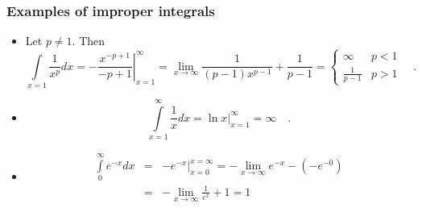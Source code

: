 \documentclass[12pt]{book}
\newcommand{\doublebrace}[4]{\left\{\begin{array}{ll} #1 & #2 \\#3 & #4  \end{array} \right.}
\begin{document}
\subsubsection{Examples of improper integrals}
\begin{itemize}
\item Let $p\neq 1$. Then
\begin{equation}\label{eqIntegralxTopthPowerToInfty}
\int\limits_{x=1} \frac{1}{x^{p}} dx = \left.-\frac{x^{-p+1}}{-p+1}\right|_{x=1}^{\infty}= \lim\limits_{x\to\infty} 
\frac{1}{(p-1) x^{p-1}}+\frac{1}{p-1} =\doublebrace{\infty}{p<1}{\frac{1}{p-1}}{p>1} \quad . 
\end{equation}
\item 
\begin{equation}\label{eqIntegral1overxToToInfty}
\int\limits_{x=1}^{\infty} \frac{1}x dx= \left.\ln x \right|_{x=1}^{\infty}= \infty\quad .
\end{equation}
\item 
\begin{equation}\label{eqGamma(1)}
\begin{array}{rcl}
\int\limits_{0}^{\infty}e^{-x}dx&=& \left.- e^{-x}\right|_{x=0}^{x=\infty}=-\lim\limits_{x\to \infty}e^{-x}  - (-e^{-0})\\&=& -\lim \limits_{x\to \infty} \frac{1}{e^{x}} +1=1
\end{array}
\end{equation}


\end{itemize}
\end{document}
